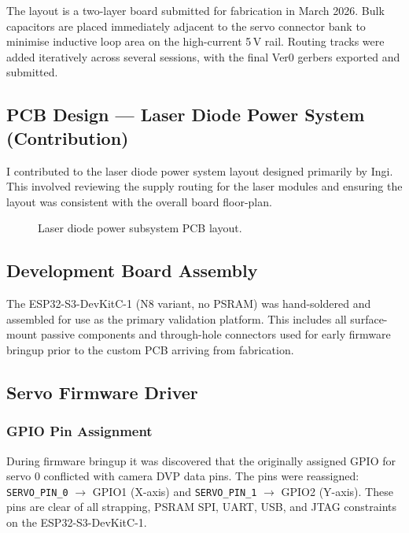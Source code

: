 \documentclass[12pt]{article}
\begin{document}
The layout is a two-layer board submitted for fabrication in March 2026.  Bulk
capacitors are placed immediately adjacent to the servo connector bank to
minimise inductive loop area on the high-current 5\,V rail.  Routing tracks were
added iteratively across several sessions, with the final Ver0 gerbers exported
and submitted.

\subsection{PCB Design --- Laser Diode Power System (Contribution)}

I contributed to the laser diode power system layout designed primarily by Ingi.
This involved reviewing the supply routing for the laser modules and ensuring the
layout was consistent with the overall board floor-plan.

\begin{figure}[H]
  \centering
  \caption{Laser diode power subsystem PCB layout.}
  \label{fig:laser_layout}
\end{figure}

\subsection{Development Board Assembly}

The ESP32-S3-DevKitC-1 (N8 variant, no PSRAM) was hand-soldered and assembled
for use as the primary validation platform.  This includes all surface-mount
passive components and through-hole connectors used for early firmware bringup
prior to the custom PCB arriving from fabrication.

\subsection{Servo Firmware Driver}

\subsubsection{GPIO Pin Assignment}

During firmware bringup it was discovered that the originally assigned GPIO for
servo 0 conflicted with camera DVP data pins.  The pins were reassigned:
\texttt{SERVO\_PIN\_0} $\rightarrow$ GPIO1 (X-axis) and
\texttt{SERVO\_PIN\_1} $\rightarrow$ GPIO2 (Y-axis).
These pins are clear of all strapping, PSRAM SPI, UART, USB, and JTAG
constraints on the ESP32-S3-DevKitC-1.
\end{document}
